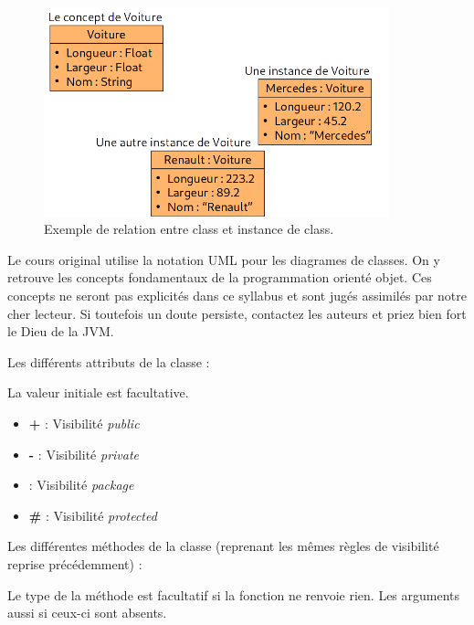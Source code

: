 \documentclass[../Syllabus.tex]{subfiles}
\begin{document}
\begin{figure}[htp]
    \centering
    \includegraphics[width=10cm]{./img/chapter2-class-instance.png}
    \caption{Exemple de relation entre class et instance de class.}
    \label{fig:chapter2-class-instance}
\end{figure}

Le cours original utilise la notation UML pour les diagrames de classes. On y retrouve les concepts fondamentaux de la programmation orienté objet. Ces concepts ne seront pas explicités dans ce syllabus et sont jugés assimilés par notre cher lecteur. Si toutefois un doute persiste, contactez les auteurs et priez bien fort le Dieu de la JVM.

Les différents attributs de la classe :


La valeur initiale est facultative.

\begin{itemize}
  \item \textbf{+} : Visibilité \textit{public}
  \item \textbf{-} : Visibilité \textit{private}
  \item \textbf{\texttildelow} : Visibilité \textit{package}
  \item \textbf{\#} : Visibilité \textit{protected}
\end{itemize}

Les différentes méthodes de la classe (reprenant les mêmes règles de visibilité reprise précédemment) :


Le type de la méthode est facultatif si la fonction ne renvoie rien. Les arguments aussi si ceux-ci sont absents.
\end{document}
